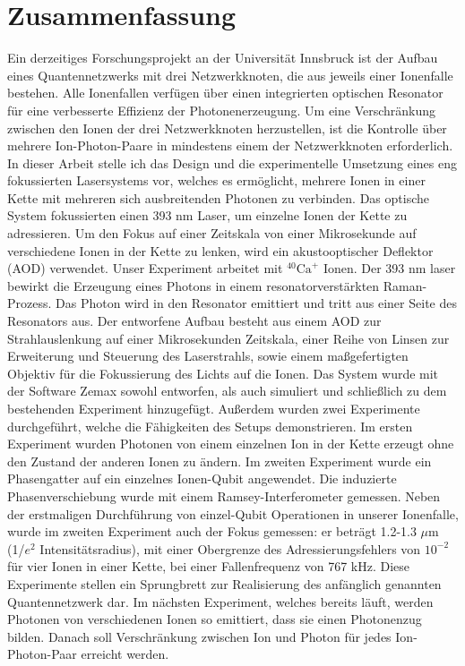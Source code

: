\documentclass[english, a4paper, 12pt, twoside]{book}
\numberwithin{equation}{section} %
\begin{document}
\section*{Zusammenfassung}
Ein derzeitiges Forschungsprojekt an der Universität Innsbruck ist der Aufbau eines Quantennetzwerks mit drei Netzwerkknoten, die aus jeweils einer Ionenfalle bestehen.
Alle Ionenfallen verfügen über einen integrierten optischen Resonator für eine verbesserte Effizienz der Photonenerzeugung.
Um eine Verschränkung zwischen den Ionen der drei Netzwerkknoten herzustellen, ist die Kontrolle über mehrere Ion-Photon-Paare
in mindestens einem der Netzwerkknoten erforderlich. In dieser Arbeit stelle ich das Design
und die experimentelle Umsetzung eines eng fokussierten Lasersystems vor, welches es ermöglicht, mehrere Ionen in einer Kette
mit mehreren sich ausbreitenden Photonen zu verbinden. Das optische System fokussierten einen 393 nm Laser, um einzelne Ionen der Kette zu adressieren. Um den Fokus auf einer Zeitskala von einer Mikrosekunde auf verschiedene Ionen in der Kette zu lenken, wird ein akustooptischer Deflektor (AOD) verwendet.
Unser Experiment arbeitet mit $^{40}\text{Ca}^+$ Ionen. Der 393 nm laser bewirkt die Erzeugung eines Photons in einem resonatorverstärkten Raman-Prozess. Das Photon wird in den Resonator emittiert und tritt aus einer Seite des Resonators aus. Der entworfene Aufbau besteht aus einem AOD zur Strahlauslenkung auf einer Mikrosekunden Zeitskala, einer Reihe von Linsen zur Erweiterung und Steuerung des Laserstrahls, sowie einem ma{\ss}gefertigten
Objektiv für die Fokussierung des Lichts auf die Ionen. Das System wurde mit der Software Zemax sowohl entworfen, als auch simuliert
und schließlich zu dem bestehenden Experiment hinzugefügt. Außerdem wurden
zwei Experimente durchgeführt, welche die Fähigkeiten des Setups demonstrieren. Im ersten Experiment wurden Photonen von einem einzelnen Ion in der Kette erzeugt ohne den Zustand der anderen Ionen zu ändern.
Im zweiten Experiment wurde ein Phasengatter auf ein einzelnes Ionen-Qubit angewendet.
Die induzierte Phasenverschiebung wurde mit einem Ramsey-Interferometer gemessen. Neben der erstmaligen Durchführung von einzel-Qubit Operationen in unserer Ionenfalle, wurde im zweiten Experiment auch der Fokus gemessen: er beträgt 1.2-1.3 $\mu$m (1/$e^2$ Intensitätsradius), mit einer Obergrenze des Adressierungsfehlers von $10^{-2}$ für vier Ionen in einer Kette, bei einer Fallenfrequenz von 767 kHz.
Diese Experimente stellen ein Sprungbrett zur Realisierung des anfänglich genannten
Quantennetzwerk dar. Im nächsten Experiment, welches bereits läuft, werden Photonen von verschiedenen Ionen so emittiert, dass sie einen Photonenzug bilden. Danach soll Verschränkung zwischen Ion und Photon für jedes Ion-Photon-Paar erreicht werden.
\end{document}
